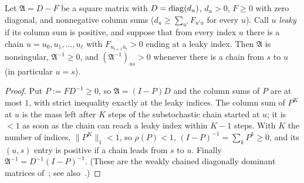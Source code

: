 \documentclass[11pt,a4paper]{report}
\begin{document}
\begin{lemma}\label{lem:Mmatrix}
Let \(\mathfrak A=D-F\) be a square matrix with \(D=\operatorname{diag}(d_u)\), \(d_u>0\), \(F\ge0\) with zero diagonal, and nonnegative column sums
(\(d_u\ge\sum_{u'}F_{u'u}\) for every \(u\)). Call \(u\) \emph{leaky} if its column sum is positive, and suppose that from every index
\(u\) there is a chain \(u=u_0,u_1,\dots,u_\ell\) with \(F_{u_{t+1}u_t}>0\) ending at a leaky index. Then \(\mathfrak A\) is nonsingular,
\(\mathfrak A^{-1}\ge0\), and \((\mathfrak A^{-1})_{us}>0\) whenever there is a chain from \(s\) to \(u\) (in particular \(u=s\)).
\end{lemma}
\begin{proof}
Put \(P:=FD^{-1}\ge0\), so \(\mathfrak A=(I-P)D\) and the column sums of \(P\) are at most \(1\), with strict inequality exactly at the
leaky indices. The column sum of \(P^K\) at \(u\) is the mass left after \(K\) steps of the substochastic chain started at \(u\); it is
\(<1\) as soon as the chain can reach a leaky index within \(K-1\) steps. With \(K\) the number of indices, \(\|P^K\|_1<1\), so
\(\rho(P)<1\), \((I-P)^{-1}=\sum_kP^k\ge0\), and its \((u,s)\) entry is positive if a chain leads from \(s\) to \(u\). Finally
\(\mathfrak A^{-1}=D^{-1}(I-P)^{-1}\). (These are the weakly chained diagonally dominant matrices of~\autocite{ShivakumarChew1974};
see also~\autocite{BermanPlemmons}.)
\end{proof}
\end{document}
